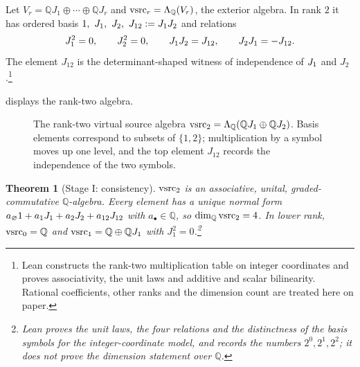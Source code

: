 \documentclass[11pt]{article}
\newtheorem{theorem}{Theorem}[section]
\theoremstyle{definition}
\newcommand{\Q}{\mathbb{Q}}
\newcommand{\Jtwo}{J_2}
\newcommand{\Jtwelve}{J_{12}}
\begin{document}
\begin{definition}\label{def:apparatus:vsrc-algebra}
Let $V_r=\Q J_1\oplus\cdots\oplus\Q J_r$ and $\vsrc_r=\Lambda_{\Q}(V_r)$,
the exterior algebra.  In rank $2$ it has ordered basis
$1,\ \Jone,\ \Jtwo,\ \Jtwelve:=\Jone\Jtwo$ and relations
\[
  \Jone^2=0,\qquad \Jtwo^2=0,\qquad
  \Jone\Jtwo=\Jtwelve,\qquad
  \Jtwo\Jone=-\Jtwelve.
\]
The element $\Jtwelve$ is the determinant-shaped witness of independence
of $J_1$ and $\Jtwo$.\footnote{Lean constructs the rank-two multiplication table on integer
coordinates and proves associativity, the unit laws and additive and
scalar bilinearity.  Rational coefficients, other ranks and the dimension
count are treated here on paper.}
\end{definition}

 displays the rank-two algebra.

\begin{figure}[htbp]
\centering
{}
\caption{The rank-two virtual source algebra \(\vsrc_2=\Lambda_{\Q}(\Q\Jone\oplus\Q\Jtwo)\).
Basis elements correspond to subsets of \(\{1,2\}\); multiplication by a
symbol moves up one level, and the top element \(\Jtwelve\) records the
independence of the two symbols.}
\label{fig:vsrc-wedge}
\end{figure}
 
\begin{theorem}[Stage I: consistency]\label{thm:apparatus:vsrc-stage-i-consistency}
$\mathrm{vsrc}_2$ is an associative, unital, graded-commutative $\Q$-algebra.
Every element has a unique normal form
$a_{\varnothing}1+a_1\Jone+a_2\Jtwo+a_{12}\Jtwelve$ with $a_\bullet\in\Q$,
so $\dim_{\Q}\vsrc_2=4$.  In lower rank, $\vsrc_0=\Q$ and
$\vsrc_1=\Q\oplus\Q J_1$ with $J_1^2=0$.\footnote{Lean proves the unit laws, the four relations and the
distinctness of the basis symbols for the integer-coordinate model, and
records the numbers $2^0,2^1,2^2$; it does not prove the dimension
statement over $\Q$.}
\end{theorem}
\end{document}
